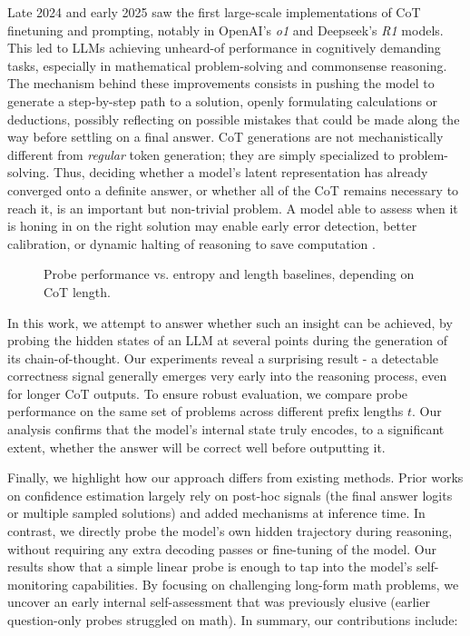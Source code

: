 \documentclass[10pt,a4paper,twocolumn]{article}
\begin{document}
Late 2024 and early 2025 saw the first large-scale implementations of CoT finetuning and prompting, notably in OpenAI's \textit{o1} \cite{openai2024openaio1card} and Deepseek's \textit{R1}\cite{deepseekai2025deepseekr1incentivizingreasoningcapability} models. This led to LLMs achieving unheard-of performance in cognitively demanding tasks, especially in mathematical problem-solving and commonsense reasoning. The mechanism behind these improvements consists in pushing the model to generate a step-by-step path to a solution, openly formulating calculations or deductions, possibly reflecting on possible mistakes that could be made along the way before settling on a final answer. CoT generations are not mechanistically different from \textit{regular} token generation; they are simply specialized to problem-solving. Thus, deciding whether a model's latent representation has already converged onto a definite answer, or whether all of the CoT remains necessary to reach it, is an important but non-trivial problem. A model able to assess when it is honing in on the right solution may enable early error detection, better calibration, or dynamic halting of reasoning to save computation \cite{mao2025earlystoppingchainofthoughtslarge}.

\begin{figure}[t]
  \vspace{1.5cm}
  \centering
  \caption{Probe performance vs. entropy and length baselines, depending on CoT length.}
  \label{fig:raw-cf}
\end{figure}


In this work, we attempt to answer whether such an insight can be achieved, by probing the hidden states of an LLM at several points during the generation of its chain-of-thought. Our experiments reveal a surprising result - a detectable correctness signal generally emerges very early into the reasoning process, even for longer CoT outputs. To ensure robust evaluation, we compare probe performance on the same set of problems across different prefix lengths $t$. Our analysis confirms that the model’s internal state truly encodes, to a significant extent, whether the answer will be correct well before outputting it.

Finally, we highlight how our approach differs from existing methods. Prior works on confidence estimation largely rely on post-hoc signals (the final answer logits or multiple sampled solutions) and added mechanisms at inference time. In contrast, we directly probe the model’s own hidden trajectory during reasoning, without requiring any extra decoding passes or fine-tuning of the model. Our results show that a simple linear probe is enough to tap into the model’s self-monitoring capabilities. By focusing on challenging long-form math problems, we uncover an early internal self-assessment that was previously elusive (earlier question-only probes struggled on math). In summary, our contributions include:
\end{document}
